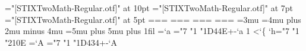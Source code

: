 
\def\space{ }
\def\loop#1\repeat{\def\body{#1}\iterate}\let\repeat=\fi
\def\iterate{\body \let\next\iterate \else\let\next\relax\fi \next}
\font\mt="[STIXTwoMath-Regular.otf]" at 10pt \font\ms="[STIXTwoMath-Regular.otf]" at 7pt \font\mss="[STIXTwoMath-Regular.otf]" at 5pt
=\mt {}=\ms {}=\mss
{}=\mt {}=\ms {}=\mss
{}=\mt {}=\ms {}=\mss
{}=\mt {}=\ms {}=\mss
{} \delimitershortfall=5pt \nulldelimiterspace=1.2pt \scriptspace=0.5pt
\thinmuskip=3mu \medmuskip=4mu plus 2mu minus 4mu \thickmuskip=5mu plus 5mu
\hsize=300pt \parindent=0pt \parfillskip=0pt plus 1fil \baselineskip=12pt
=`a \loop \Umathcode{}="7 "1 \numexpr"1D44E+-`a\relax
  \advance{} 1 \ifnum{}<`\{\repeat
\Umathcode`h="7 "1 "210E
=`A \loop \Umathcode{}="7 "1 \numexpr"1D434+-`A\relax
